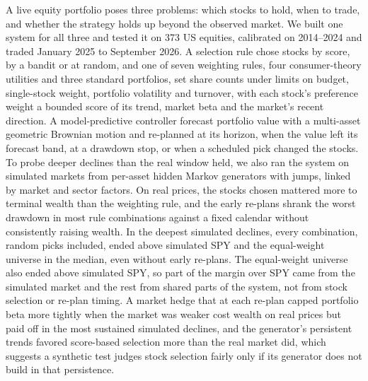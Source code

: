 A live equity portfolio poses three problems: which stocks to hold, when to trade, and whether the strategy holds up
beyond the observed market. We built one system for all three and tested it on 373 US equities, calibrated on
2014--2024 and traded January 2025 to September 2026. A selection rule chose stocks by score, by a bandit or at
random, and one of seven weighting rules, four consumer-theory utilities and three standard portfolios, set share
counts under limits on budget, single-stock weight, portfolio volatility and turnover, with each stock's preference
weight a bounded score of its trend, market beta and the market's recent direction. A model-predictive controller
forecast portfolio value with a multi-asset geometric Brownian motion and re-planned at its horizon, when the value
left its forecast band, at a drawdown stop, or when a scheduled pick changed the stocks. To probe deeper declines than the real window held, we also ran the
system on simulated markets from per-asset hidden Markov generators with jumps, linked by market and sector factors.
On real prices, the stocks chosen mattered more to terminal wealth than the weighting rule, and the early re-plans
shrank the worst drawdown in most rule combinations against a fixed calendar without consistently raising wealth. In
the deepest simulated declines, every combination, random picks included, ended above simulated SPY and the
equal-weight universe in the median, even without early re-plans. The equal-weight universe also ended above
simulated SPY, so part of the margin over SPY came from the simulated market and the rest from shared parts of the
system, not from stock selection or re-plan timing. A market hedge that at each re-plan capped portfolio beta more tightly when the market was weaker cost
wealth on real prices but paid off in the most sustained simulated declines, and the generator's persistent trends
favored score-based selection more than the real market did, which suggests a synthetic test judges stock selection
fairly only if its generator does not build in that persistence.
